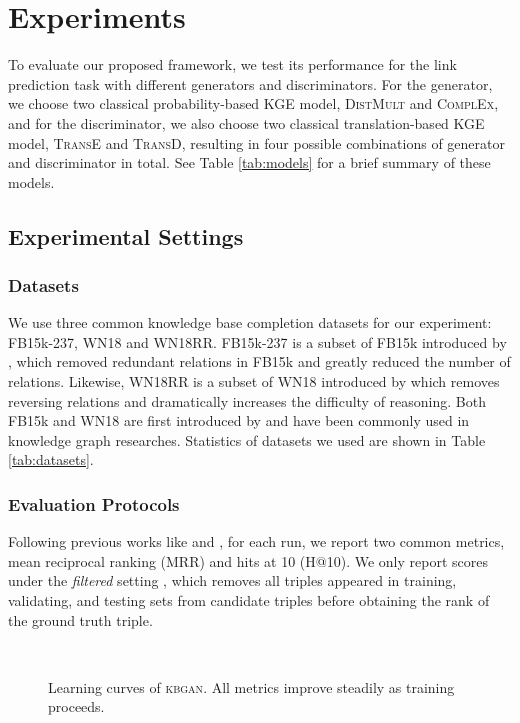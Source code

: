 \documentclass[11pt,a4paper]{article}
\begin{document}
\section{Experiments}

To evaluate our proposed framework, we test its performance for the link prediction task with different generators and discriminators. For the generator, we choose two classical probability-based KGE model, \textsc{DistMult} and \textsc{ComplEx}, and for the discriminator,  we also choose two classical translation-based KGE model, \textsc{TransE} and \textsc{TransD}, resulting in four possible combinations of generator and discriminator in total. See Table \ref{tab:models} for a brief summary of these models.

\subsection{Experimental Settings}
\subsubsection{Datasets}
We use three common knowledge base completion datasets for our experiment: FB15k-237, WN18 and WN18RR. FB15k-237 is a subset of FB15k introduced by \cite{Toutanova2015}, which removed redundant relations in FB15k and greatly reduced the number of relations. Likewise, WN18RR is a subset of WN18 introduced by \cite{conve} which removes reversing relations and dramatically increases the difficulty of reasoning. Both FB15k and WN18 are first introduced by \cite{bordes2013translating} and have been commonly used in knowledge graph researches. Statistics of datasets we used are shown in Table \ref{tab:datasets}.

\subsubsection{Evaluation Protocols}
Following previous works like \cite{yang2015embedding} and \cite{trouillon2016complex}, for each run, we report two common metrics, mean reciprocal ranking (MRR) and hits at 10 (H@10). We only report scores under the \emph{filtered} setting \cite{bordes2013translating}, which removes all triples appeared in training, validating, and testing sets from candidate triples before obtaining the rank of the ground truth triple.

\begin{figure*}[!t]
\centering
{}
\\
\caption{Learning curves of \textsc{kbgan}. All metrics improve steadily as training proceeds.}
\label{fig:curves} 
\end{figure*}
\end{document}
